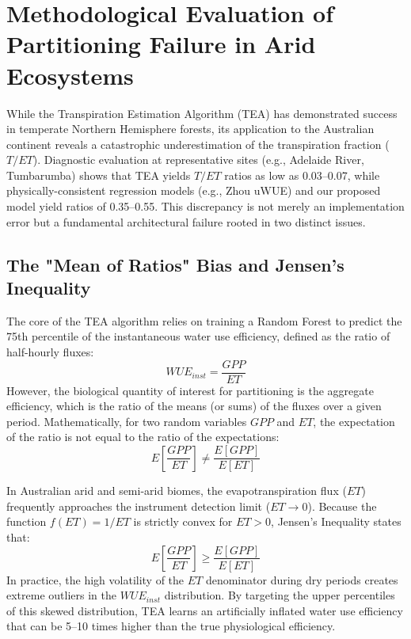 \section{Methodological Evaluation of Partitioning Failure in Arid Ecosystems}

While the Transpiration Estimation Algorithm (TEA) \citep{nelson2018} has demonstrated success in temperate Northern Hemisphere forests, its application to the Australian continent reveals a catastrophic underestimation of the transpiration fraction ($T/ET$). Diagnostic evaluation at representative sites (e.g., Adelaide River, Tumbarumba) shows that TEA yields $T/ET$ ratios as low as 0.03--0.07, while physically-consistent regression models (e.g., Zhou uWUE) and our proposed model yield ratios of 0.35--0.55. This discrepancy is not merely an implementation error but a fundamental architectural failure rooted in two distinct issues.

\subsection{The "Mean of Ratios" Bias and Jensen's Inequality}

The core of the TEA algorithm relies on training a Random Forest to predict the 75th percentile of the instantaneous water use efficiency, defined as the ratio of half-hourly fluxes:
\begin{equation}
    WUE_{inst} = \frac{GPP}{ET}
\end{equation}
However, the biological quantity of interest for partitioning is the aggregate efficiency, which is the ratio of the means (or sums) of the fluxes over a given period. Mathematically, for two random variables $GPP$ and $ET$, the expectation of the ratio is not equal to the ratio of the expectations:
\begin{equation}
    E\left[\frac{GPP}{ET}\right] \neq \frac{E[GPP]}{E[ET]}
\end{equation}

In Australian arid and semi-arid biomes, the evapotranspiration flux ($ET$) frequently approaches the instrument detection limit ($ET \to 0$). Because the function $f(ET) = 1/ET$ is strictly convex for $ET > 0$, Jensen's Inequality states that:
\begin{equation}
    E\left[\frac{GPP}{ET}\right] \geq \frac{E[GPP]}{E[ET]}
\end{equation}
In practice, the high volatility of the $ET$ denominator during dry periods creates extreme outliers in the $WUE_{inst}$ distribution. By targeting the upper percentiles of this skewed distribution, TEA learns an artificially inflated water use efficiency that can be 5--10 times higher than the true physiological efficiency.

